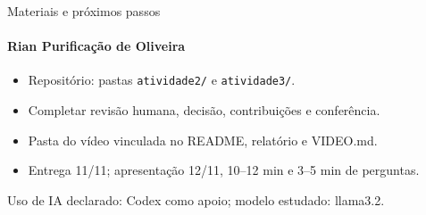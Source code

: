 \documentclass[aspectratio=169,11pt]{beamer}
\newcommand{\pessoa}[1]{\framesubtitle{#1}}
\begin{document}
\begin{frame}{Materiais e próximos passos}
\pessoa{Rian Purificação de Oliveira}
\begin{itemize}\setlength{\itemsep}{0.7em}
\item Repositório: pastas \texttt{atividade2/} e \texttt{atividade3/}.
\item Completar revisão humana, decisão, contribuições e conferência.
\item Pasta do vídeo vinculada no README, relatório e VIDEO.md.
\item Entrega 11/11; apresentação 12/11, 10--12 min e 3--5 min de perguntas.
\end{itemize}\bigskip
Uso de IA declarado: Codex como apoio; modelo estudado: llama3.2.
\end{frame}
\end{document}
